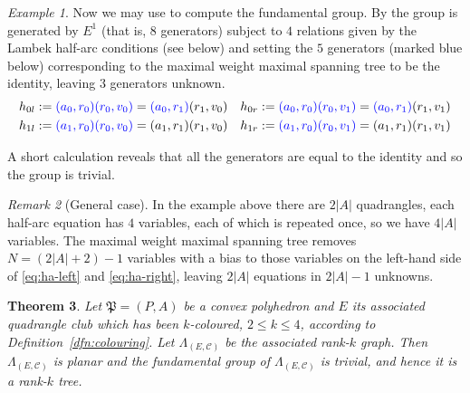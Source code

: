 \documentclass[12pt]{amsart}
\newtheorem{thm}{Theorem}[section]
\theoremstyle{definition}
\theoremstyle{remark}
\newtheorem{rmk}[thm]{Remark}
\newtheorem{example}[thm]{Example}
\numberwithin{equation}{section}
\newcommand{\Cc}{\mathcal{C}}
\begin{document}
\begin{example}
\noindent
Now we may use \cite[Theorem 5.1]{KPW} to compute the fundamental group.  By \cite[Theorem 5.3]{KPW} the group is generated by $E^1$ (that is, $8$ generators) subject to $4$ relations given by the Lambek half-arc conditions (see below) and setting the $5$ generators (marked blue below) corresponding to the maximal weight maximal spanning tree to be the identity, leaving $3$ generators unknown.
\begin{align*}
h_{0l} := {\color{blue} (a_0,r_0)} {\color{blue} (r_0,v_0)} = {\color{blue}(a_0,r_1)}{(r_1,v_0)}& \quad
h_{0r} := {\color{blue}  (a_0,r_0)}{\color{blue} (r_0,v_1)} = {\color{blue}(a_0,r_1)}{(r_1,v_1)} \\
%
h_{1l} := {\color{blue} (a_1,r_0)}{\color{blue} (r_0,v_0)}= {(a_1,r_1)}{(r_1,v_0)} & \quad
h_{1r} :=  {\color{blue}(a_1,r_0)} {\color{blue}(r_0,v_1)} = {(a_1,r_1)}{(r_1,v_1)}
\end{align*}

\noindent
A short calculation reveals that all the generators are  equal to the identity and so the group is trivial. 
\end{example}

\begin{rmk}[General case] \label{rmk:summary}
In the example above there are $2 |A|$ quadrangles, each half-arc equation has $4$ variables, each of which is repeated once, so we have $4 |A|$ variables. The maximal weight maximal spanning tree removes $N=(2|A|+2)-1$ variables with a bias to those variables on the left-hand side of \eqref{eq:ha-left} and \eqref{eq:ha-right}, leaving $2|A|$ equations in $2|A|-1$ unknowns.
\end{rmk}

\begin{thm} \label{thm:fgistriv}
Let $\mathfrak{P}=(P,A)$ be a convex polyhedron and $E$ its associated quadrangle club which has been $k$-coloured, $2 \le k \le 4$, according to Definition~\ref{dfn:colouring}. Let $\Lambda_{(E,\Cc)}$ be the associated rank-$k$ graph. Then $\Lambda_{(E,\Cc)}$ is planar and the fundamental group of $\Lambda_{(E,\Cc)}$ is trivial, and hence it is a rank-$k$ tree.
\end{thm}
\end{document}

